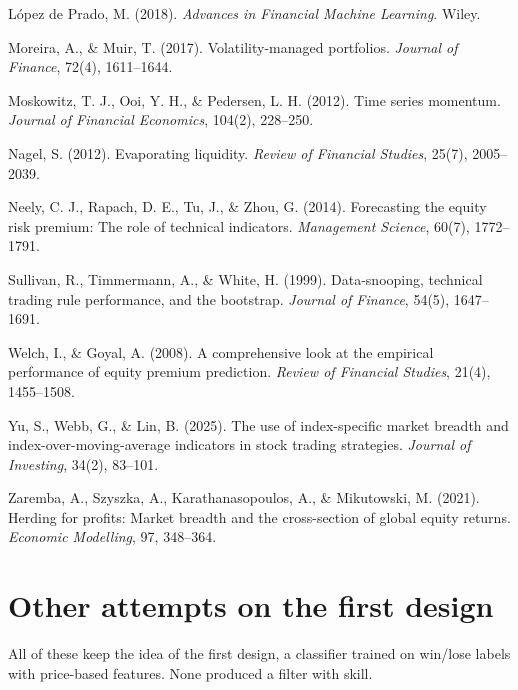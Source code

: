 \documentclass[11pt]{article}
\newenvironment{reflist}{\begin{list}{}{\setlength{\leftmargin}{1.5em}\setlength{\itemindent}{-1.5em}\setlength{\itemsep}{3pt}\setlength{\parsep}{0pt}}}{\end{list}}
\begin{document}
\begin{reflist}
\item
  López de Prado, M. (2018). \emph{Advances in Financial Machine Learning}. Wiley.
\item
  Moreira, A., \& Muir, T. (2017). Volatility-managed portfolios. \emph{Journal of Finance}, 72(4), 1611--1644.
\item
  Moskowitz, T. J., Ooi, Y. H., \& Pedersen, L. H. (2012). Time series momentum. \emph{Journal of Financial Economics}, 104(2), 228--250.
\item
  Nagel, S. (2012). Evaporating liquidity. \emph{Review of Financial Studies}, 25(7), 2005--2039.
\item
  Neely, C. J., Rapach, D. E., Tu, J., \& Zhou, G. (2014). Forecasting the equity risk premium: The role of technical indicators. \emph{Management Science}, 60(7), 1772--1791.
\item
  Sullivan, R., Timmermann, A., \& White, H. (1999). Data-snooping, technical trading rule performance, and the bootstrap. \emph{Journal of Finance}, 54(5), 1647--1691.
\item
  Welch, I., \& Goyal, A. (2008). A comprehensive look at the empirical performance of equity premium prediction. \emph{Review of Financial Studies}, 21(4), 1455--1508.
\item
  Yu, S., Webb, G., \& Lin, B. (2025). The use of index-specific market breadth and index-over-moving-average indicators in stock trading strategies. \emph{Journal of Investing}, 34(2), 83--101.
\item
  Zaremba, A., Szyszka, A., Karathanasopoulos, A., \& Mikutowski, M. (2021). Herding for profits: Market breadth and the cross-section of global equity returns. \emph{Economic Modelling}, 97, 348--364.
\end{reflist}

\appendix
\setcounter{figure}{0}
\renewcommand{\thefigure}{A\arabic{figure}}

\section{Other attempts on the first design}

All of these keep the idea of the first design, a classifier trained on win/lose labels with price-based features. None produced a filter with skill.
\end{document}
